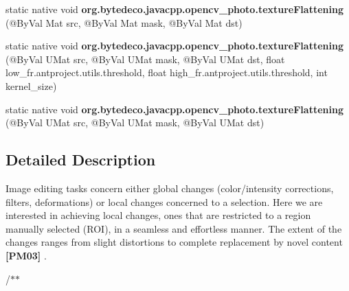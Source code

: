 \begin{DoxyCompactItemize}
static native void {\bfseries org.\+bytedeco.\+javacpp.\+opencv\+\_\+photo.\+texture\+Flattening} (@By\+Val Mat src, @By\+Val Mat mask, @By\+Val Mat dst)
\item 
\mbox{\label{group__photo__clone_gacf724a2ceb10e438d8944e43f003bba6}} 
static native void {\bfseries org.\+bytedeco.\+javacpp.\+opencv\+\_\+photo.\+texture\+Flattening} (@By\+Val U\+Mat src, @By\+Val U\+Mat mask, @By\+Val U\+Mat dst, float low\+\_\+fr.antproject.utils.threshold, float high\+\_\+fr.antproject.utils.threshold, int kernel\+\_\+size)
\item 
\mbox{\label{group__photo__clone_ga2a2550084b65b902ccd13d98370b43b7}} 
static native void {\bfseries org.\+bytedeco.\+javacpp.\+opencv\+\_\+photo.\+texture\+Flattening} (@By\+Val U\+Mat src, @By\+Val U\+Mat mask, @By\+Val U\+Mat dst)
\end{DoxyCompactItemize}


\subsection{Detailed Description}
Image editing tasks concern either global changes (color/intensity corrections, filters, deformations) or local changes concerned to a selection. Here we are interested in achieving local changes, ones that are restricted to a region manually selected (R\+OI), in a seamless and effortless manner. The extent of the changes ranges from slight distortions to complete replacement by novel content {\bfseries [P\+M03]} . 

/$\ast$$\ast$


